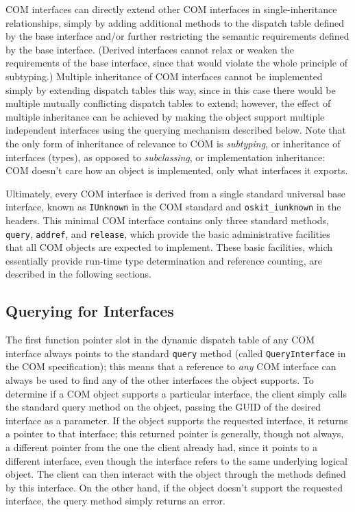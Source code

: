 
COM interfaces can directly extend other COM interfaces
in single-inheritance relationships,
simply by adding additional methods
to the dispatch table defined by the base interface
and/or further restricting the semantic requirements
defined by the base interface.
(Derived interfaces cannot relax or weaken
the requirements of the base interface,
since that would violate the whole principle of subtyping.)
Multiple inheritance of COM interfaces
cannot be implemented simply by extending dispatch tables this way,
since in this case there would be
multiple mutually conflicting dispatch tables to extend;
however, the effect of multiple inheritance
can be achieved by making the object support multiple independent interfaces
using the querying mechanism described below.
Note that the only form of inheritance of relevance to COM
is \emph{subtyping}, or inheritance of interfaces (types),
as opposed to \emph{subclassing}, or implementation inheritance:
COM doesn't care how an object is implemented,
only what interfaces it exports.

Ultimately, every COM interface is derived
from a single standard universal base interface,
known as \texttt{IUnknown} in the COM standard
and \texttt{oskit_iunknown} in the \oskit{} headers.
This minimal COM interface
contains only three standard methods,
\texttt{query}, \texttt{addref}, and \texttt{release},
which provide the basic administrative facilities
that all COM objects are expected to implement.
These basic facilities,
which essentially provide run-time type determination and reference counting,
are described in the following sections.

\subsection{Querying for Interfaces}

The first function pointer slot
in the dynamic dispatch table of any COM interface
always points to the standard \texttt{query} method
(called \texttt{QueryInterface} in the COM specification);
this means that a reference to \emph{any} COM interface
can always be used to find any of the other interfaces the object supports.
To determine if a COM object supports a particular interface,
the client simply calls the standard query method on the object,
passing the GUID of the desired interface as a parameter.
If the object supports the requested interface,
it returns a pointer to that interface;
this returned pointer is generally, though not always,
a different pointer from the one the client already had,
since it points to a different interface,
even though the interface refers to the same underlying logical object.
The client can then interact with the object
through the methods defined by this interface.
On the other hand,
if the object doesn't support the requested interface,
the query method simply returns an error.

